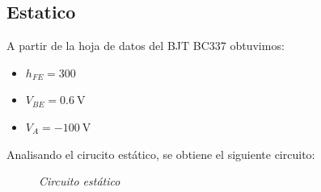 \documentclass[a4paper,12pt]{article}
\newcommand{\mV}[1]{\SI{#1}{\volt}}
\begin{document}
\subsection{Estatico}
    A partir de la hoja de datos del BJT BC337 obtuvimos:
    \begin{itemize}
        \item $h_{FE} = 300$
        \item $V_{BE} = \mV{0.6}$
        \item $V_A = \mV{-100}$
    \end{itemize}

    Analisando el cirucito estático, se obtiene el siguiente circuito:
    \begin{figure}[H]
        \setlength{\abovecaptionskip}{0pt}
		\centering
		\captionsetup{labelformat=empty}
		\caption{\small{\textit{ Circuito estático }}}
    \end{figure}
\end{document}
